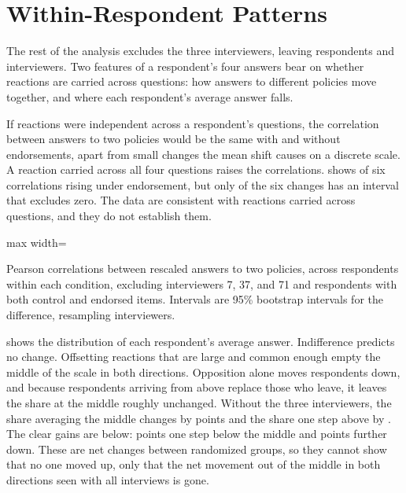 \documentclass[11pt,letterpaper]{article}
\newcommand{\TableStyle}{\normalsize\setlength{\tabcolsep}{6pt}\renewcommand{\arraystretch}{1}}
\newcommand{\tablenote}[1]{\par\smallskip\begin{minipage}{\linewidth}\footnotesize #1\end{minipage}}
\begin{document}
\section{Within-Respondent Patterns}
\label{sec:within}

The rest of the analysis excludes the three interviewers, leaving \SampleSize{} respondents and \CleanInterviewerCount{} interviewers. Two features of a respondent's four answers bear on whether reactions are carried across questions: how answers to different policies move together, and where each respondent's average answer falls.

If reactions were independent across a respondent's questions, the correlation between answers to two policies would be the same with and without endorsements, apart from small changes the mean shift causes on a discrete scale. A reaction carried across all four questions raises the correlations.  shows \CorrelationsRising{} of six correlations rising under endorsement, but only \CorrelationsExcludingZero{} of the six changes has an interval that excludes zero. The data are consistent with reactions carried across questions, and they do not establish them.

\begin{table}[htbp]
\centering\TableStyle
\caption{Correlations between policy answers, by condition}
\label{tab:within_correlation}
\begin{adjustbox}{max width=\linewidth}

\end{adjustbox}
\tablenote{Pearson correlations between rescaled answers to two policies, across respondents within each condition, excluding interviewers 7, 37, and 71 and respondents with both control and endorsed items. Intervals are 95\% bootstrap intervals for the difference, resampling interviewers.}
\end{table}

 shows the distribution of each respondent's average answer. Indifference predicts no change. Offsetting reactions that are large and common enough empty the middle of the scale in both directions. Opposition alone moves respondents down, and because respondents arriving from above replace those who leave, it leaves the share at the middle roughly unchanged. Without the three interviewers, the share averaging the middle changes by \MidpointChange{} points and the share one step above by \AboveMidpointChange{}. The clear gains are below: \BelowMidpointChange{} points one step below the middle and \LowerTailChange{} points further down. These are net changes between randomized groups, so they cannot show that no one moved up, only that the net movement out of the middle in both directions seen with all interviews is gone.
\end{document}
